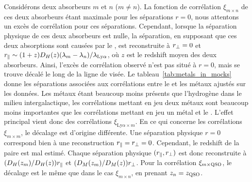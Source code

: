 \documentclass[11pt, twoside, a4paper, openright]{report}
\begin{document}
{Considérons deux absorbeurs $m$ et $n$ ($m \neq n$). La fonction de corrélation $\xi_{m \times n}$ de ces deux absorbeurs étant maximale pour les séparations $r = 0$, nous attentons un excès de corrélation pour ces séparations.
Cependant, lorsque la séparation physique de ces deux absorbeurs est nulle, la séparation, en supposant que ces deux absorptions sont causées par le \lya{}, est reconstruite à $r_{\perp}{} = 0$ et $r_{\parallel}{} \sim (1+z)D_H(z)(\lambda_m - \lambda_{n} ) / \lambda_{\mathrm{Ly}\alpha}$, où $z$ est le redshift moyen des deux absorbeurs. Ainsi, l'excès de corrélation observé n'est pas situé à $r = 0$, mais se trouve décalé le long de la ligne de visée.
Le tableau~\ref{tab:metals_in_mocks} donne les séparations associées aux corrélations entre le \lya{} et les métaux ajustés sur les données.
Les métaux étant beaucoup moins présents que l'hydrogène dans le milieu intergalactique, les corrélations mettant en jeu deux métaux sont beaucoup moins importantes que les corrélations mettant en jeu un métal et le \lya{}. %
L'effet principal vient donc des corrélations $\xi_{\mathrm{Ly}\alpha \times m}$. %
En ce qui concerne les corrélations $\xi_{m \times m}$, le décalage est d'origine différente. Une séparation physique $r=0$ correspond bien à une reconstruction $r_{\parallel}{} = r_{\perp}{} = 0$. Cependant, le redshift de la paire est mal estimé. Chaque séparation physique $(r_{\parallel}{}, r_{\perp}{})$ est donc reconstruite à $(D_H(z_m) / D_H(z))r_{\parallel}{}$ et $(D_M(z_m)/D_M(z))r_{\perp}{}$.
Pour la corrélation $\xi_{m \times \textsc{QSO}}$, le décalage est le même que dans le cas $\xi_{m\times n}$, en prenant $z_n = z_{\textsc{QSO}}$.
}
\end{document}
